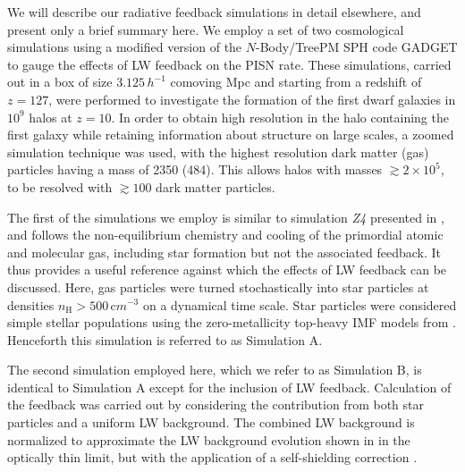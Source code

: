 \documentclass[../thesis.tex]{subfiles}
\begin{document}
We will describe our radiative feedback simulations in detail
elsewhere, and present only a brief summary here.  We employ a set of
two cosmological simulations using a modified version of the
$N$-Body/TreePM SPH code GADGET \citep{Springel2005,Springeletal2001}
to gauge the effects of LW feedback on the PISN rate. These
simulations, carried out in a box of size $3.125 \,h^{-1}$ comoving
Mpc and starting from a redshift of $z=127$, were performed to
investigate the formation of the first dwarf galaxies in $10^9$\msun
halos at $z=10$. In order to obtain high resolution in the halo
containing the first galaxy while retaining information about
structure on large scales, a zoomed simulation technique was used,
with the highest resolution dark matter (gas) particles having a mass
of 2350 (484)\msun. This allows halos with masses $\gtrsim 2
\times 10^5$\msun, to be resolved with $\gtrsim 100$ dark
matter particles.

The first of the simulations we employ is similar to simulation \textit{Z4} 
presented in \citet{PawlikMilosavljevicBromm2011}, and follows
the non-equilibrium chemistry and cooling of the primordial atomic and
molecular gas, including star formation but not the associated
feedback.  It thus provides a useful reference against which the
effects of LW feedback can be discussed. Here, gas particles were
turned stochastically into star particles at densities $n_{\mathrm H} >
500 \,{\mathrm cm}^{-3}$ on a dynamical time scale. Star particles were
considered simple stellar populations using the zero-metallicity
top-heavy IMF models from \citet{Schaerer2003}.  Henceforth this
simulation is referred to as Simulation A.

The second simulation employed here, which we refer to as Simulation
B, is identical to Simulation A except for the inclusion of LW
feedback.  Calculation of the feedback was carried out by considering
the contribution from both star particles and a uniform LW background.
The combined LW background is normalized to approximate the LW
background evolution shown in \citet{GreifBromm2006} in the optically
thin limit, but with the application of a self-shielding correction
\citep{Wolcott-GreenHaimanBryan2011}.
\end{document}
